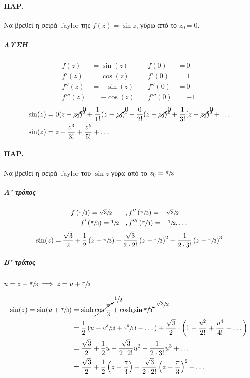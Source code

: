 \documentclass[12pt,a4paper,notitlepage,fleqn]{article}
\begin{document}
  \paragraph{ΠΑΡ.}
  Να βρεθεί η σειρά Taylor της \( f(z) = \sin z \), γύρω από το \( z_0 = 0 \).
  \subparagraph{ΛΥΣΗ}
  \[
  \begin{array}{rlrl}
  f(z) &= \sin(z)  \qquad & f(0)&=0                    \\
  f'(z) &= \cos(z) & f'(0) &= 1                     \\
  f''(z) &= -\sin(z) & f''(0) &= 0                  \\
  f'''(z) &= -\cos(z) & f'''(0) &= -1
  \end{array}
  \]
  \begin{align*}
  \sin(z) &= 0(z-\cancelto{0}{z_0})^0 + \frac{1}{1!}(z-\cancelto{0}{z_0})^1
  + \frac{0}{2!}(z-\cancelto{0}{z_0})^2 + \frac{1}{3!}(z-\cancelto{0}{z_0})^3+\dots
  \\ \sin(z) &= z - \frac{z^3}{3!} + \frac{z^5}{5!} + \dots
  \end{align*}

  \paragraph{ΠΑΡ.}
  Να βρεθεί η σειρά Taylor του \( \sin z \) γύρω από το \( z_0 = \sfrac{\pi}{3} \)
  \subparagraph{Α' τρόπος}
  \begin{align*}
  f\left(\sfrac{\pi}{3} \right) = \sfrac{\sqrt{3}}{2} \qquad &,
  f''\left(\sfrac{\pi}{3} \right) = -\sfrac{\sqrt{3}}{2} \\
  f'\left(\sfrac{\pi}{3} \right) = \sfrac{1}{2} \quad &,
  f'''\left(\sfrac{\pi}{3} \right) = -\sfrac{1}{2},\dots\end{align*}\[
  \\ \sin(z)=\frac{\sqrt{3}}{2}+\frac{1}{2}\left(z-\sfrac{\pi}{3} \right)
  -\frac{\sqrt{3}}{2\cdot 2!} \left(z-\sfrac{\pi}{3} \right)^2
  -\frac{1}{2\cdot 3!}\left( z-\sfrac{\pi}{3}  \right)^3
  \]
  \subparagraph{Β' τρόπος}
  \( u = z-\sfrac{\pi}{3} \implies z=u+\sfrac{\pi}{3}   \)

  \begin{align*}
  \sin(z) = \sin(u+\sfrac{\pi}{3} ) &=
  \sinh \cancelto{\sfrac{1}{2} }{\cos\frac{\pi}{3}}
  +\cosh \cancelto{\sfrac{\sqrt{3}}{2} }{\sin\sfrac{\pi}{3}}
  \\ &= \frac{1}{2}\left(
  u-\sfrac{u^3}{3!} +\sfrac{u^5}{5!} -\dots
  \right) + \frac{\sqrt{3}}{2} \cdot \left(
  1-\frac{u^2}{2!} + \frac{u^4}{4!} - \dots
  \right)
  \\ &= \frac{\sqrt{3}}{2} + \frac{1}{2}u-\frac{\sqrt{3}}{2\cdot 2!}u^2
  -\frac{1}{2\cdot 3!}u^3+\dots
  \\ &= \frac{\sqrt{3}}{2}+\frac{1}{2}\left( z-\frac{\pi}{3} \right)
  -\frac{\sqrt{3}}{2\cdot 2!} \left( z-\frac{\pi}{3} \right)^2 - \dots
  \end{align*}
\end{document}
